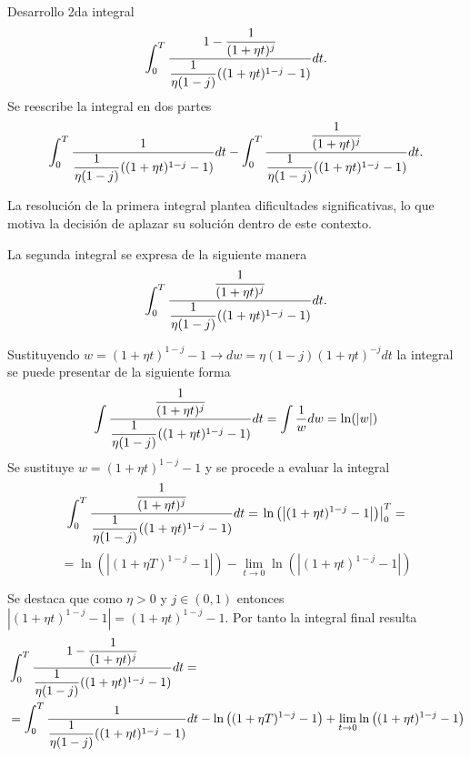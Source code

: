\begin{lem}{Desarrollo 2da integral}
$$\displaystyle \int_0^{T} \dfrac{1 - \dfrac{1}{(1+\eta t)^j}}{\dfrac{1}{\eta(1-j)}((1+\eta t)^{1-j}-1)} dt.$$
Se reescribe la integral en dos partes
$$\displaystyle \int_0^{T} \dfrac{1}{\dfrac{1}{\eta(1-j)}((1+\eta t)^{1-j}-1)} dt -\displaystyle \int_0^{T} \dfrac{\dfrac{1}{(1+\eta t)^j}}{\dfrac{1}{\eta(1-j)}((1+\eta t)^{1-j}-1)} dt.$$

La resolución de la primera integral plantea dificultades significativas, lo que motiva la decisión de aplazar su solución dentro de este contexto.

La segunda integral se expresa de la siguiente manera
$$\displaystyle \int_0^{T} \dfrac{\dfrac{1}{(1+\eta t)^j}}{\dfrac{1}{\eta(1-j)}((1+\eta t)^{1-j}-1)} dt.$$

Sustituyendo $w=(1+\eta t)^{1-j}-1 \rightarrow dw=\eta(1-j)(1+\eta t)^{-j} dt$ la integral se puede presentar de la siguiente forma
$$\displaystyle \int \dfrac{\dfrac{1}{(1+\eta t)^j}}{\dfrac{1}{\eta(1-j)}((1+\eta t)^{1-j}-1)} dt=\displaystyle \int \dfrac{1}{w} dw=\ln(\left| w\right|)$$
Se sustituye $w=(1+\eta t)^{1-j}-1 $ y se procede a evaluar la integral
$$\displaystyle \int_0^{T} \dfrac{\dfrac{1}{(1+\eta t)^j}}{\dfrac{1}{\eta(1-j)}((1+\eta t)^{1-j}-1)} dt=\left.\ln\left(\left| (1+\eta t)^{1-j}-1\right|\right)\right|_0^T=$$
$$=\ln\left(\left| (1+\eta T)^{1-j}-1\right|\right)-\lim_{t \to 0} \ln\left(\left| (1+\eta t)^{1-j}-1\right|\right)$$

Se destaca que como $\eta>0$ y $j \in (0,1)$ entonces $\left| (1+\eta t)^{1-j}-1\right|= (1+\eta t)^{1-j}-1$. Por tanto la integral final resulta
\begin{equation*}
    \begin{split}
        &\displaystyle \int_0^{T} \dfrac{1 - \dfrac{1}{(1+\eta t)^j}}{\dfrac{1}{\eta(1-j)}((1+\eta t)^{1-j}-1)} dt=\\
        &=\displaystyle \int_0^{T} \dfrac{1}{\dfrac{1}{\eta(1-j)}((1+\eta t)^{1-j}-1)} dt-\ln\left((1+\eta T)^{1-j}-1\right)+\lim_{t \to 0} \ln\left((1+\eta t)^{1-j}-1\right)
    \end{split}
\end{equation*}
\end{lem}



